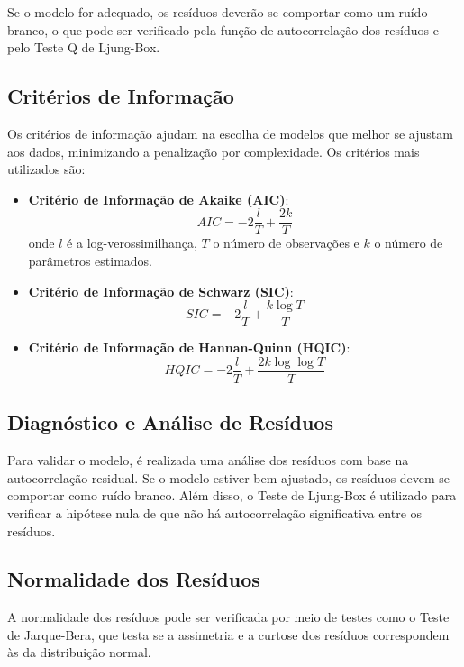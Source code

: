 \documentclass{sciposter}
\begin{document}
\begin{multicols}{3}
Se o modelo for adequado, os resíduos deverão se comportar como um ruído branco, o que pode ser verificado pela função de autocorrelação dos resíduos e pelo Teste Q de Ljung-Box.

\subsection{Critérios de Informação}
Os critérios de informação ajudam na escolha de modelos que melhor se ajustam aos dados, minimizando a penalização por complexidade. Os critérios mais utilizados são:

\begin{itemize}
    \item \textbf{Critério de Informação de Akaike (AIC)}: 
    \[
    AIC = -2 \frac{l}{T} + \frac{2k}{T}
    \]
    onde $l$ é a log-verossimilhança, $T$ o número de observações e $k$ o número de parâmetros estimados.
    
    \item \textbf{Critério de Informação de Schwarz (SIC)}: 
    \[
    SIC = -2 \frac{l}{T} + \frac{k \log T}{T}
    \]
    
    \item \textbf{Critério de Informação de Hannan-Quinn (HQIC)}: 
    \[
    HQIC = -2 \frac{l}{T} + \frac{2k \log \log T}{T}
    \]
\end{itemize}

\subsection{Diagnóstico e Análise de Resíduos}
Para validar o modelo, é realizada uma análise dos resíduos com base na autocorrelação residual. Se o modelo estiver bem ajustado, os resíduos devem se comportar como ruído branco. Além disso, o Teste de Ljung-Box é utilizado para verificar a hipótese nula de que não há autocorrelação significativa entre os resíduos.

\subsection{Normalidade dos Resíduos}
A normalidade dos resíduos pode ser verificada por meio de testes como o Teste de Jarque-Bera, que testa se a assimetria e a curtose dos resíduos correspondem às da distribuição normal.


\end{multicols}
\end{document}
